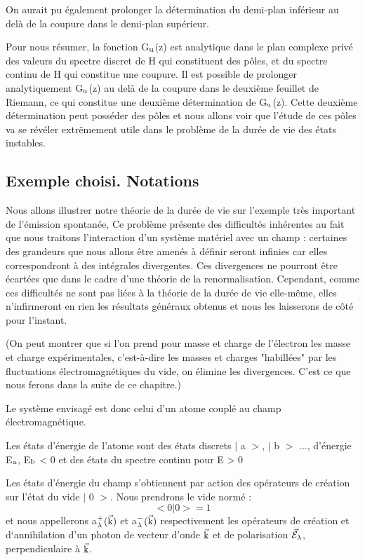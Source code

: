 On aurait pu également prolonger la détermination du demi-plan
inférieur au delà de la coupure dans le demi-plan supérieur.

Pour nous résumer, la fonction G$_{\text{u}}$(z) est analytique dans le plan
complexe privé des valeurs du spectre discret de H qui constituent des pôles,
et du spectre continu de H qui constitue une coupure. Il est possible de prolonger analytiquement G$_{\text{u}}$(z) au delà de la coupure dans le deuxième feuillet de
Riemann, ce qui constitue une deuxième détermination de G$_{\text{u}}$(z). Cette deuxième
détermination peut posséder des pôles et nous allons voir que l'étude de ces
pôles va se révéler extrëmement utile dans le problème de la durée de vie des
états instables.



\subsection{Exemple choisi. Notations}%

Nous allons illustrer notre théorie de la durée de vie sur l'exemple
très important de l'émission spontanée, Ce problème présente des difficultés
inhérentes au fait que nous traitons l'interaction d'un système matériel avec
un champ : certaines des grandeurs que nous allons être amenés à définir
seront infinies car elles correspondront à des intégrales divergentes. Ces
divergences ne pourront être écartées que dans le cadre d'une théorie de la renormalisation. Cependant, comme ces difficultés ne sont pas liées à la théorie
de la durée de vie elle-même, elles n'infirmeront en rien les résultats généraux obtenus et nous les laisserons de côté pour l'instant.

(On peut montrer que si l'on prend pour masse et charge de l'électron les masse et
charge expérimentales, c'est-à-dire les masses et charges "habillées" par les fluctuations électromagnétiques du vide, on élimine les divergences. C'est ce que nous
ferons dans la suite de ce chapitre.)

Le système envisagé est donc celui d'un atome couplé au champ
électromagnétique.

Les états d'énergie de l'atome sont des états discrets $|$ a $>$,
$|$ b $>$ ..., d'énergie E$_{\text{a}}$, E$_{\text{b}}$ < 0 et des états du spectre continu pour E > 0

Les états d'énergie du champ s'obtiennent par action des opérateurs de création sur l'état du vide $|$ 0 $>$. Nous prendrons le vide normé :
\[
\tag{5}<0|0>=1
\]
et nous appellerons a$_\lambda^+(\vec{\text{k}})$ et a$_\lambda^-(\vec{\text{k}})$ respectivement les opérateurs de création
et d‘annihilation d'un photon de vecteur d'onde $\vec{\text{k}}$ et de polarisation $\vec{\mathcal{E}}_\lambda$, perpendiculaire à $\vec{\text{k}}$.

